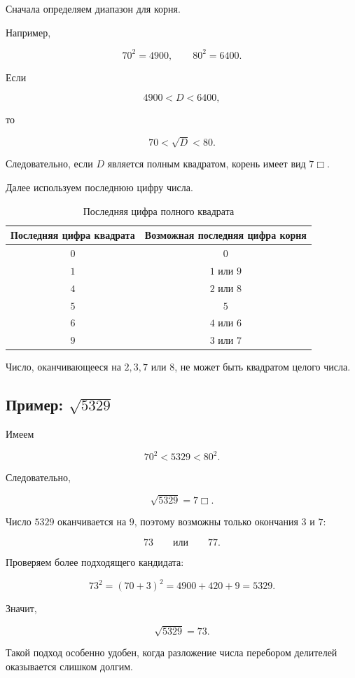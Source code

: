 \documentclass[a4paper,12pt]{article}
\begin{document}
Сначала определяем диапазон для корня.

Например,

\[
70^2=4900,\qquad
80^2=6400.
\]

Если

\[
4900<D<6400,
\]

то

\[
70<\sqrt D<80.
\]

Следовательно, если \(D\) является полным квадратом, корень имеет вид \(7\Box\).

Далее используем последнюю цифру числа.

\begin{table}[ht]
\centering
\caption{Последняя цифра полного квадрата}
\begin{tabular}{@{}cc@{}}
\toprule
\textbf{Последняя цифра квадрата} &
\textbf{Возможная последняя цифра корня}
\\
\midrule
\(0\) & \(0\) \\
\(1\) & \(1\) или \(9\) \\
\(4\) & \(2\) или \(8\) \\
\(5\) & \(5\) \\
\(6\) & \(4\) или \(6\) \\
\(9\) & \(3\) или \(7\) \\
\bottomrule
\end{tabular}
\end{table}

Число, оканчивающееся на \(2,3,7\) или \(8\), не может быть квадратом целого числа.

\subsection*{\color{darkaccent}Пример: \(\sqrt{5329}\)}

Имеем

\[
70^2<5329<80^2.
\]

Следовательно,

\[
\sqrt{5329}=7\Box.
\]

Число \(5329\) оканчивается на \(9\), поэтому возможны только окончания \(3\) и \(7\):

\[
73\qquad\text{или}\qquad77.
\]

Проверяем более подходящего кандидата:

\[
73^2=(70+3)^2
=4900+420+9
=5329.
\]

Значит,

\[
\boxed{\sqrt{5329}=73}.
\]

Такой подход особенно удобен, когда разложение числа перебором делителей оказывается слишком долгим.
\end{document}
